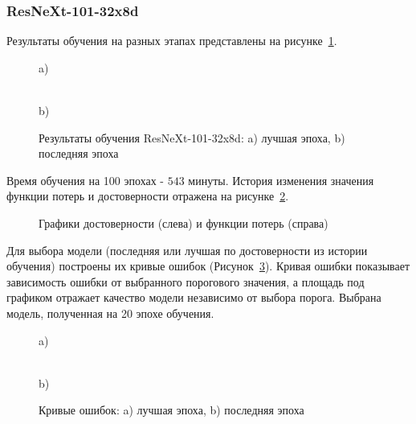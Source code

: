 \subsubsection{ResNeXt-101-32x8d}
Результаты обучения на разных этапах представлены на рисунке~\ref{cp101epoch}.

\begin{figure}[H]
	\begin{minipage}[h]{0.55\linewidth}
		\center{\texttt{[image: cp101-1]}} a) \\
	\end{minipage}
	\hfill
	\begin{minipage}[h]{0.43\linewidth}
		\center{\texttt{[image: cp101-100]}} \\b)
	\end{minipage}
	\caption{Результаты обучения ResNeXt-101-32x8d: a) лучшая эпоха, b)
		последняя эпоха}
	\label{cp101epoch}
\end{figure}

Время обучения на 100 эпохах - $543$ минуты. История изменения значения функции потерь и достоверности отражена на рисунке~\ref{cp101-loss}. 

\begin{figure}[H]
	\caption{Графики достоверности (слева) и функции потерь (справа)} 
	\label{cp101-loss} 
\end{figure}

Для выбора модели (последняя или лучшая по достоверности из истории обучения) построены их кривые ошибок (Рисунок~\ref{cp101-roc}). Кривая ошибки показывает зависимость ошибки от выбранного порогового значения, а площадь под графиком отражает качество модели независимо от выбора порога. Выбрана модель, полученная на 20 эпохе обучения.

\begin{figure}[H]
	\begin{minipage}[h]{0.49\linewidth}
		 a) \\
	\end{minipage}
	\hfill
	\begin{minipage}[h]{0.49\linewidth}
		 \\b)
	\end{minipage}
	\caption{Кривые ошибок: a) лучшая эпоха, b)
		последняя эпоха}
	\label{cp101-roc}
\end{figure}

